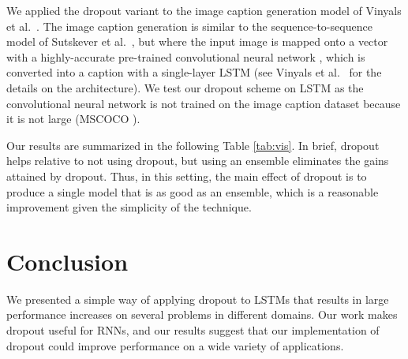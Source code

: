 \documentclass{article} %
\begin{document}
	
	
	We applied the dropout variant 
	to the image caption generation model of Vinyals et al.~\cite{vinyals2014show}.  The 
	image caption generation is similar to the sequence-to-sequence model
	of Sutskever et al.~\cite{sutskever2014sequence}, but where the input image is mapped
	onto a vector with a highly-accurate pre-trained convolutional
	neural network \citep{szegedy2014going}, which is converted
	into a caption with a single-layer LSTM (see Vinyals et al.~\cite{vinyals2014show}
	for the details on the architecture).  We test our dropout scheme on  
	LSTM as the convolutional neural network is not trained on the image caption
	dataset because it is not large (MSCOCO \citep{lin2014microsoft}). 
	
	Our results are summarized in the following Table \ref{tab:vis}.  In brief,
	dropout helps relative to not using dropout, but using an ensemble
	eliminates the gains attained by dropout.  Thus, in this setting,
	the main effect of dropout is to produce a single model that is as
	good as an ensemble, which is a reasonable improvement given
	the simplicity of the technique.  
	
	
	
	\section{Conclusion}
	
	We presented a simple way of applying dropout to LSTMs that results in
	large performance increases on several problems in different domains.
	Our work makes dropout useful for RNNs, and our results suggest that
	our implementation of dropout could improve performance on a wide
	variety of applications.
	
	
	\small
	
	
	
	
\end{document}
